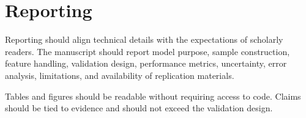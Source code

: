 \section{Reporting}

Reporting should align technical details with the expectations of scholarly readers. The manuscript should report model purpose, sample construction, feature handling, validation design, performance metrics, uncertainty, error analysis, limitations, and availability of replication materials.

Tables and figures should be readable without requiring access to code. Claims should be tied to evidence and should not exceed the validation design.

